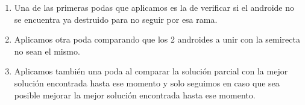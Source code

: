 \begin{enumerate}
\item Una de las primeras podas que aplicamos es la de verificar si el androide no se encuentra ya destruido para no seguir por esa rama.
\item Aplicamos otra poda comparando que los 2 androides a unir con la semirecta no sean el mismo.
\item Aplicamos también una poda al comparar la solución parcial con la mejor solución encontrada hasta ese momento y solo seguimos en caso que sea posible mejorar la mejor solución encontrada hasta ese momento.
\end{enumerate}

